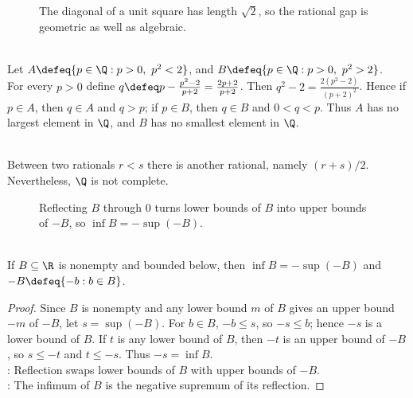 \begin{figure}[H]
  \centering
  
  \caption{The diagonal of a unit square has length $\sqrt{2}$, so the rational gap is geometric as well as algebraic.}
  \label{fig:unit-square-sqrt-two}
\end{figure}

\begin{example} \label{ex:rational-cut-around-square-root-two} \\
Let $A\defeq\{p\in\Q:p>0,\ p^2<2\}$, and $B\defeq\{p\in\Q:p>0,\ p^2>2\}$.\\
For every $p>0$ define $q\defeq p-\frac{p^2-2}{p+2}=\frac{2p+2}{p+2}$. Then $q^2-2=\frac{2(p^2-2)}{(p+2)^2}$.
Hence if $p\in A$, then $q\in A$ and $q>p$; if $p\in B$, then $q\in B$ and $0<q<p$. Thus $A$ has no largest element in $\Q$, and $B$ has no smallest element in $\Q$.
\end{example}

\begin{remark} \label{rem:rational-density-does-not-fill-gaps} \\
Between two rationals $r<s$ there is another rational, namely $(r+s)/2$. Nevertheless, $\Q$ is not complete.
\end{remark}

\begin{figure}[H]
  \centering
  
  \caption{Reflecting $B$ through $0$ turns lower bounds of $B$ into upper bounds of $-B$, so $\inf B=-\sup(-B)$.}
  \label{fig:infimum-reflection-via-supremum}
\end{figure}

\begin{corollary} \label{cor:infimum-as-negative-supremum} \\
If $B\subseteq\R$ is nonempty and bounded below, then $\inf B=-\sup(-B)$ and $-B\defeq\{-b:b\in B\}$.
\begin{proof}
Since $B$ is nonempty and any lower bound $m$ of $B$ gives an upper bound $-m$ of $-B$, let $s=\sup(-B)$. For $b\in B$, $-b\leq s$, so $-s\leq b$; hence $-s$ is a lower bound of $B$. If $t$ is any lower bound of $B$, then $-t$ is an upper bound of $-B$, so $s\leq -t$ and $t\leq -s$. Thus $-s=\inf B$.\\
: Reflection swaps lower bounds of $B$ with upper bounds of $-B$.\\
: The infimum of $B$ is the negative supremum of its reflection.
\end{proof}
\end{corollary}


